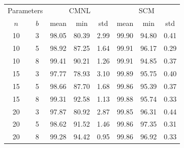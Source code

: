 \begin{tabular}{cc|ccc|ccc}
\toprule
\multicolumn{2}{c|}{Parameters} & \multicolumn{3}{c|}{CMNL} & \multicolumn{3}{c}{SCM} \\
$n$ & $b$ & mean & min & std & mean & min & std \\
\midrule
10 & 3 & 98.05 & 80.39 & 2.99 & 99.90 & 94.80 & 0.41 \\
10 & 5 & 98.92 & 87.25 & 1.64 & 99.91 & 96.17 & 0.29 \\
10 & 8 & 99.41 & 90.21 & 1.26 & 99.91 & 94.85 & 0.37 \\
15 & 3 & 97.77 & 78.93 & 3.10 & 99.89 & 95.75 & 0.40 \\
15 & 5 & 98.66 & 87.70 & 1.68 & 99.86 & 95.39 & 0.37 \\
15 & 8 & 99.31 & 92.58 & 1.13 & 99.88 & 95.74 & 0.33 \\
20 & 3 & 97.87 & 80.92 & 2.87 & 99.85 & 96.31 & 0.44 \\
20 & 5 & 98.62 & 91.52 & 1.46 & 99.86 & 97.35 & 0.31 \\
20 & 8 & 99.28 & 94.42 & 0.95 & 99.86 & 96.92 & 0.33 \\
\bottomrule
\end{tabular}
